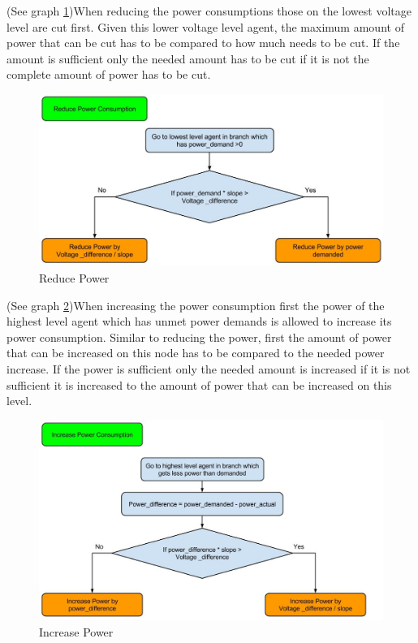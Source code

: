 \documentclass[a4paper]{article}
\begin{document}
(See graph \ref{constrain3_1})When reducing the power consumptions those on the lowest voltage level are cut first. Given this lower voltage level agent, the maximum 
amount of power that can be cut has to be compared to how much needs to be cut. If the amount is sufficient only the needed amount has 
to be cut if it is not the complete amount of power has to be cut.\\
\begin{figure}[!ht]
 \centering
 \includegraphics[width = \textwidth]{constrain3_1.jpg}
 \caption{Reduce Power}
 \label{constrain3_1}
\end{figure}
(See graph \ref{constrain3_2})When increasing the power consumption first the power of the highest level agent which has unmet power demands is allowed to increase its 
power consumption. Similar to reducing the power, first the amount of power that can be increased on this node has to be compared to the 
needed power increase. If the power is sufficient only the needed amount is increased if it is not sufficient it is increased to the 
amount of power that can be increased on this level. \\
\begin{figure}[!ht]
 \centering
 \includegraphics[width = \textwidth]{constrain3_2.jpg}
 \caption{Increase Power}
 \label{constrain3_2}
\end{figure}
\clearpage
\end{document}
